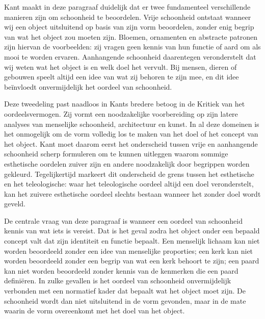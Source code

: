 \begin{mdframed}[leftmargin=0pt,rightmargin=0pt,backgroundcolor=blue!6,linecolor=white,innertopmargin=6pt,innerbottommargin=6pt]
\bigskip
Kant maakt in deze paragraaf duidelijk dat er twee fundamenteel verschillende manieren zijn om schoonheid te beoordelen. Vrije schoonheid ontstaat wanneer wij een object uitsluitend op basis van zijn vorm beoordelen, zonder enig begrip van wat het object zou moeten zijn. Bloemen, ornamenten en abstracte patronen zijn hiervan de voorbeelden: zij vragen geen kennis van hun functie of aard om als mooi te worden ervaren. Aanhangende schoonheid daarentegen veronderstelt dat wij weten wat het object is en welk doel het vervult. Bij mensen, dieren of gebouwen speelt altijd een idee van wat zij behoren te zijn mee, en dit idee beïnvloedt onvermijdelijk het oordeel van schoonheid.

Deze tweedeling past naadloos in Kants bredere betoog in de Kritiek van het oordeelsvermogen. Zij vormt een noodzakelijke voorbereiding op zijn latere analyses van menselijke schoonheid, architectuur en kunst. In al deze domeinen is het onmogelijk om de vorm volledig los te maken van het doel of het concept van het object. Kant moet daarom eerst het onderscheid tussen vrije en aanhangende schoonheid scherp formuleren om te kunnen uitleggen waarom sommige esthetische oordelen zuiver zijn en andere noodzakelijk door begrippen worden gekleurd. Tegelijkertijd markeert dit onderscheid de grens tussen het esthetische en het teleologische: waar het teleologische oordeel altijd een doel veronderstelt, kan het zuivere esthetische oordeel slechts bestaan wanneer het zonder doel wordt geveld.

De centrale vraag van deze paragraaf is wanneer een oordeel van schoonheid kennis van wat iets is vereist. Dat is het geval zodra het object onder een bepaald concept valt dat zijn identiteit en functie bepaalt. Een menselijk lichaam kan niet worden beoordeeld zonder een idee van menselijke proporties; een kerk kan niet worden beoordeeld zonder een begrip van wat een kerk behoort te zijn; een paard kan niet worden beoordeeld zonder kennis van de kenmerken die een paard definiëren. In zulke gevallen is het oordeel van schoonheid onvermijdelijk verbonden met een normatief kader dat bepaalt wat het object moet zijn. De schoonheid wordt dan niet uitsluitend in de vorm gevonden, maar in de mate waarin de vorm overeenkomt met het doel van het object.


\end{mdframed}
